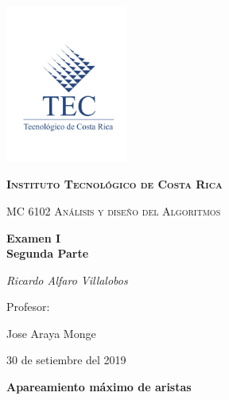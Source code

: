\documentclass[12pt,a4paper]{article}
\begin{document}
\begin{titlepage}
	\centering
	\includegraphics[width=0.30\textwidth]{Teclogocompleto.jpg}\par\vspace{1cm}
	{\scshape\large \textbf{Instituto Tecnológico de Costa Rica }\par}
	\vspace{1cm}
	{\scshape\Large MC 6102 Análisis y diseño del Algoritmos\par}
	\vspace{1.5cm}
	{\Large\bfseries Examen I\\Segunda Parte\par}
	\vspace{2cm}
	{\Large\itshape Ricardo Alfaro Villalobos\par}
	\vfill
	Profesor:\par
	Jose Araya Monge\textsc{}

	\vfill

	{\large 30 de setiembre del 2019\par}
\end{titlepage}

\begin{center}
\LARGE \textbf {Apareamiento máximo de aristas}
\end{center}
\end{document}
